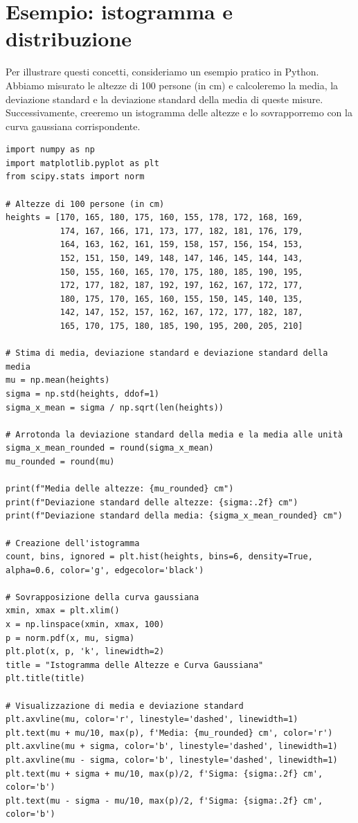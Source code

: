 \documentclass[a4paper,12pt]{article}
\begin{document}
\section{Esempio: istogramma e distribuzione}
Per illustrare questi concetti, consideriamo un esempio pratico in Python. Abbiamo misurato le altezze di 100 persone (in cm) e calcoleremo la media, la deviazione standard e la deviazione standard della media di queste misure. Successivamente, creeremo un istogramma delle altezze e lo sovrapporremo con la curva gaussiana corrispondente.

\begin{lstlisting}[caption={Script Python per calcolare e visualizzare le altezze}]
import numpy as np
import matplotlib.pyplot as plt
from scipy.stats import norm

# Altezze di 100 persone (in cm)
heights = [170, 165, 180, 175, 160, 155, 178, 172, 168, 169, 
           174, 167, 166, 171, 173, 177, 182, 181, 176, 179, 
           164, 163, 162, 161, 159, 158, 157, 156, 154, 153, 
           152, 151, 150, 149, 148, 147, 146, 145, 144, 143,
           150, 155, 160, 165, 170, 175, 180, 185, 190, 195,
           172, 177, 182, 187, 192, 197, 162, 167, 172, 177,
           180, 175, 170, 165, 160, 155, 150, 145, 140, 135,
           142, 147, 152, 157, 162, 167, 172, 177, 182, 187,
           165, 170, 175, 180, 185, 190, 195, 200, 205, 210]

# Stima di media, deviazione standard e deviazione standard della media
mu = np.mean(heights)
sigma = np.std(heights, ddof=1)
sigma_x_mean = sigma / np.sqrt(len(heights))

# Arrotonda la deviazione standard della media e la media alle unità
sigma_x_mean_rounded = round(sigma_x_mean)
mu_rounded = round(mu)

print(f"Media delle altezze: {mu_rounded} cm")
print(f"Deviazione standard delle altezze: {sigma:.2f} cm")
print(f"Deviazione standard della media: {sigma_x_mean_rounded} cm")

# Creazione dell'istogramma
count, bins, ignored = plt.hist(heights, bins=6, density=True, alpha=0.6, color='g', edgecolor='black')

# Sovrapposizione della curva gaussiana
xmin, xmax = plt.xlim()
x = np.linspace(xmin, xmax, 100)
p = norm.pdf(x, mu, sigma)
plt.plot(x, p, 'k', linewidth=2)
title = "Istogramma delle Altezze e Curva Gaussiana"
plt.title(title)

# Visualizzazione di media e deviazione standard
plt.axvline(mu, color='r', linestyle='dashed', linewidth=1)
plt.text(mu + mu/10, max(p), f'Media: {mu_rounded} cm', color='r')
plt.axvline(mu + sigma, color='b', linestyle='dashed', linewidth=1)
plt.axvline(mu - sigma, color='b', linestyle='dashed', linewidth=1)
plt.text(mu + sigma + mu/10, max(p)/2, f'Sigma: {sigma:.2f} cm', color='b')
plt.text(mu - sigma - mu/10, max(p)/2, f'Sigma: {sigma:.2f} cm', color='b')


\end{lstlisting}
\end{document}
